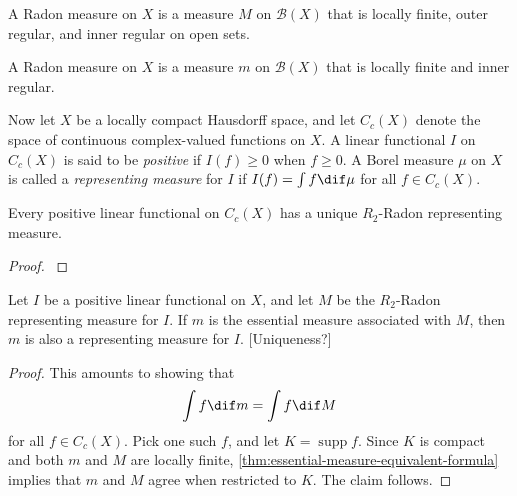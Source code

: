 \documentclass[article, a4paper, 11pt, oneside]{memoir}
\numberwithin{equation}{chapter}
\newcommand{\calB}{\mathcal{B}}
\newcommand{\borel}[1]{\calB(#1)}
\DeclareMathOperator{\supp}{supp}
\begin{document}
\begin{definition}
    A Radon measure on $X$ is a measure $M$ on $\borel{X}$ that is locally finite, outer regular, and inner regular on open sets.
\end{definition}

\begin{definition}
    A Radon measure on $X$ is a measure $m$ on $\borel{X}$ that is locally finite and inner regular.
\end{definition}


Now let $X$ be a locally compact Hausdorff space, and let $C_c(X)$ denote the space of continuous complex-valued functions on $X$. A linear functional $I$ on $C_c(X)$ is said to be \emph{positive} if $I(f) \geq 0$ when $f \geq 0$. A Borel measure $\mu$ on $X$ is called a \emph{representing measure} for $I$ if $I(f) = \int f \dif\mu$ for all $f \in C_c(X)$.

\begin{theorem}
    Every positive linear functional on $C_c(X)$ has a unique $R_2$-Radon representing measure.
\end{theorem}

\begin{proof}
    \textcite[Theorem~7.2]{folland2007}
\end{proof}

\begin{proposition}
    Let $I$ be a positive linear functional on $X$, and let $M$ be the $R_2$-Radon representing measure for $I$. If $m$ is the essential measure associated with $M$, then $m$ is also a representing measure for $I$. [Uniqueness?]
\end{proposition}

\begin{proof}
    This amounts to showing that
    \begin{equation*}
        \int f \dif m = \int f \dif M
    \end{equation*}
    for all $f \in C_c(X)$. Pick one such $f$, and let $K = \supp f$. Since $K$ is compact and both $m$ and $M$ are locally finite, \cref{thm:essential-measure-equivalent-formula} implies that $m$ and $M$ agree when restricted to $K$. The claim follows.
\end{proof}



\nocite{*}

\printbibliography
\end{document}
